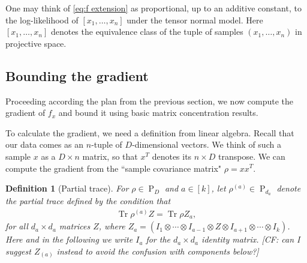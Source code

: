 \documentclass{article}
\newtheorem{definition}{Definition}
\newcommand{\ot}{\otimes}
\newcommand\PD{\operatorname{P}}
\newcommand\samp{x}
\newcommand\rv{X}
\newcommand\tr{\operatorname{Tr}}
\newcommand{\CF}[1]{{\color{purple}[CF: #1]}}
\begin{document}

One may think of \cref{eq:f extension} as proportional, up to an additive constant, to the log-likelihood of $[\samp_1, \dots, \samp_n]$ under the tensor normal model. Here $[\samp_1, \dots, \samp_n]$ denotes the equivalence class of the tuple of samples $(x_1, \dots, x_n)$ in projective space.




\subsection{Bounding the gradient}
Proceeding according the plan from the previous section, we now compute the gradient of $f_{\samp}$ and bound it using basic matrix concentration results.

To calculate the gradient, we need a definition from linear algebra. Recall that our data comes as an $n$-tuple of $D$-dimensional vectors. We think of such a sample $\samp$ as a $D \times n$ matrix, so that $\samp^T$ denotes its $n \times D$ transpose. We can compute the gradient from the ``sample covariance matrix" $\rho = \samp \samp^T$.

\begin{definition}[Partial trace]\label{def:single marginal}
For $\rho \in \PD_D$ and $a\in[k]$, let $\rho^{(a)} \in \PD_{d_a}$ denote the \emph{partial trace} defined by the condition that
\begin{align*}
  \tr \rho^{(a)} Z = \tr \rho Z_a,
\end{align*}
for all $d_a \times d_a$ matrices $Z$, where $Z_a = (I_1 \ot \cdots \ot I_{a-1} \ot Z \ot I_{a+1} \ot \cdots \ot I_k)$.
Here and in the following we write $I_a$ for the $d_a\times d_a$ identity matrix. \CF{can I suggest $Z_{(a)}$ instead to avoid the confusion with components below?}
\end{definition}
\end{document}
